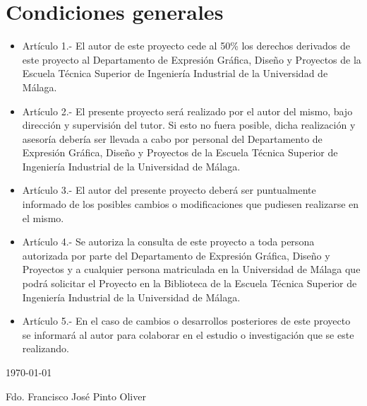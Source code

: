\chapter*{Condiciones generales}
\begin{itemize}
\item Artículo 1.- El autor de este proyecto cede al 50\% los derechos derivados de este proyecto al Departamento de Expresión Gráfica, Diseño y Proyectos de la Escuela Técnica Superior de Ingeniería Industrial de la Universidad de Málaga.

\item Artículo 2.- El presente proyecto será realizado por el autor del mismo, bajo dirección y supervisión del tutor. Si esto no fuera posible, dicha realización y asesoría debería ser llevada a cabo por personal del Departamento de Expresión Gráfica, Diseño y Proyectos de la Escuela Técnica Superior de Ingeniería Industrial de la Universidad de Málaga.

\item Artículo 3.- El autor del presente proyecto deberá ser puntualmente informado de los posibles cambios o modificaciones que pudiesen realizarse en el mismo.

\item Artículo 4.- Se autoriza la consulta de este proyecto a toda persona autorizada por parte del Departamento de Expresión Gráfica, Diseño y Proyectos y a cualquier persona matriculada en la Universidad de Málaga que podrá solicitar el Proyecto en la Biblioteca de la Escuela Técnica Superior de Ingeniería Industrial de la Universidad de Málaga.

\item Artículo 5.- En el caso de cambios o desarrollos posteriores de este proyecto se informará al autor para colaborar en el estudio o investigación que se este realizando.
\end{itemize}

\today

\begin{flushright}
Fdo. Francisco José Pinto Oliver
\end{flushright}
\vfill

